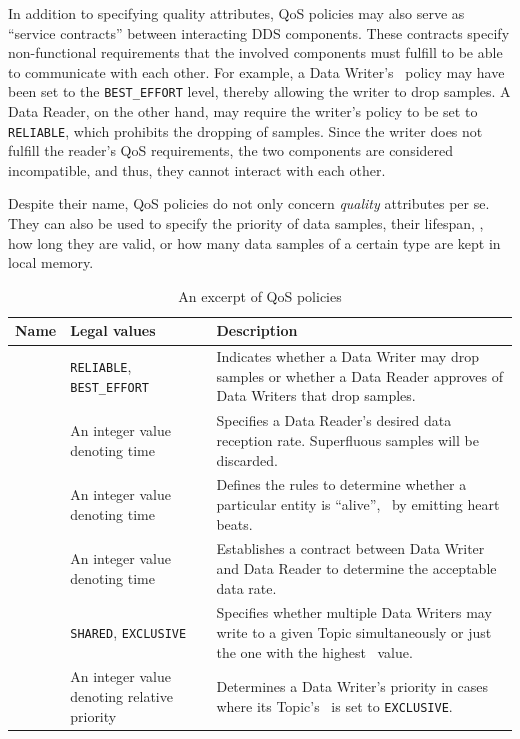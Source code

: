 In addition to specifying quality attributes, QoS policies may also serve as ``service contracts'' between interacting DDS components. These contracts specify non-functional requirements that the involved components must fulfill to be able to communicate with each other. For example, a Data Writer's \reliability\ policy may have been set to the \texttt{BEST\_EFFORT} level, thereby allowing the writer to drop samples. A Data Reader, on the other hand, may require the writer's policy to be set to \texttt{RELIABLE}, which prohibits the dropping of samples. Since the writer does not fulfill the reader's QoS requirements, the two components are considered incompatible, and thus, they cannot interact with each other.

Despite their name, QoS policies do not only concern \emph{quality} attributes per se. They can also be used to specify the priority of data samples, their lifespan, \ie , how long they are valid, or how many data samples of a certain type are kept in local memory.


\begin{table}[H]
  \caption[An excerpt of DDS QoS policies]{An excerpt of QoS policies}\label{tab:qos}
  \centering
  \begin{tabular}{p{} p{}  p{}}
    \toprule
      \textbf{Name} & \textbf{Legal values} & \textbf{Description} \\
    \midrule
    	\reliability  & \texttt{RELIABLE}, \texttt{BEST\_EFFORT} & Indicates whether a Data Writer may drop samples or whether a Data Reader approves of Data Writers that drop samples.\\
    	\tbf  & An integer value denoting time & Specifies a Data Reader's desired data reception rate. Superfluous samples will be discarded.\\
    	\liveliness  & An integer value denoting time & Defines the rules to determine whether a particular entity is ``alive'', \eg\ by emitting heart beats. \\
    	\deadline  & An integer value denoting time & Establishes a contract between Data Writer and Data Reader to determine the acceptable data rate. \\
    	\ownership  & \texttt{SHARED}, \texttt{EXCLUSIVE} & Specifies whether multiple Data Writers may write to a given Topic simultaneously or just the one with the highest \ostrength\  value.\\
    	\ostrength  & An integer value denoting relative priority & Determines a Data Writer's priority in cases where its Topic's \ownership\ is set to \texttt{EXCLUSIVE}. \\
    \bottomrule
  \end{tabular}
\end{table}
%
%
%
%
%
%
%
%
%
%
%
%
\pagebreak
